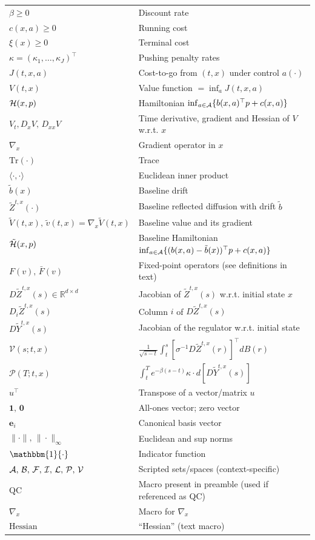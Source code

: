 \documentclass[11pt]{article}
\theoremstyle{definition}
\theoremstyle{plain}
\newcommand{\R}{\mathbb{R}}
\newcommand{\qc}{\textrm{QC}}
\newcommand{\cF}{{\cal F}}
\newcommand{\cB}{{\cal B}}
\newcommand{\cH}{{\cal H}}
\newcommand{\cV}{{\cal V}}
\newcommand{\cA}{{\cal A}}
\newcommand{\cP}{{\cal P}}
\newcommand{\cI}{{\cal I}}
\newcommand{\cL}{{\cal L}}
\newcommand{\tb}{\tilde{b}}
\newcommand{\be}{\bm{e}}
\newcommand{\bZero}{\bm{0}}
\newcommand{\bOne}{\bm{1}}
\newcommand{\mbOne}{\mathbbm{1}}
\newcommand{\tr}{\text{Tr}}
\newcommand{\Hess}{\text{Hessian}}
\newcommand{\grad}{\nabla_x}
\begin{document}
\begin{longtable}{@{}ll@{}}
$\beta\ge 0$ & Discount rate \\
$c(x,a)\ge 0$ & Running cost \\
$\xi(x)\ge 0$ & Terminal cost \\
$\kappa=(\kappa_1,\dots,\kappa_J)^{\top}$ & Pushing penalty rates \\
$J(t,x,a)$ & Cost-to-go from $(t,x)$ under control $a(\cdot)$ \\
$V(t,x)$ & Value function $=\inf_a J(t,x,a)$ \\
$\cH(x,p)$ & Hamiltonian $\inf_{a\in\cA}\{ b(x,a)^{\top}p + c(x,a)\}$ \\
$V_t, D_x V,\, D_{xx}V$ & Time derivative, gradient and Hessian of $V$ w.r.t. $x$ \\
$\nabla_x$ & Gradient operator in $x$ \\
$\tr(\cdot)$ & Trace \\
$\langle\cdot,\cdot\rangle$ & Euclidean inner product \\

$\tb(x)$ & Baseline drift \\
$\tilde Z^{t,x}(\cdot)$ & Baseline reflected diffusion with drift $\tb$ \\
$\tilde V(t,x),\, \tilde v(t,x)=\nabla_x \tilde V(t,x)$ & Baseline value and its gradient \\
$\tilde \cH(x,p)$ & Baseline Hamiltonian $\inf_{a\in\cA}\{(b(x,a)-\tb(x))^{\top}p + c(x,a)\}$ \\
$F(v),\, \bar F(v)$ & Fixed-point operators (see definitions in text) \\

$D\tilde Z^{t,x}(s)\in\R^{d\times d}$ & Jacobian of $\tilde Z^{t,x}(s)$ w.r.t. initial state $x$ \\
$D_i\tilde Z^{t,x}(s)$ & Column $i$ of $D\tilde Z^{t,x}(s)$ \\
$D\tilde Y^{t,x}(s)$ & Jacobian of the regulator w.r.t. initial state \\
$\mathcal{V}(s;t,x)$ & $\frac{1}{\sqrt{s-t}}\int_t^s [\sigma^{-1}D\tilde Z^{t,x}(r)]^{\top} dB(r)$ \\
$\mathcal{P}(T;t,x)$ & $\int_t^T e^{-\beta(s-t)} \kappa \cdot d[ D\tilde Y^{t,x}(s) ]$ \\

$u^{\top}$ & Transpose of a vector/matrix $u$ \\
$\bOne,\, \bZero$ & All-ones vector; zero vector \\
$\be_i$ & Canonical basis vector \\
$\|\cdot\|,\, \|\cdot\|_\infty$ & Euclidean and sup norms \\
$\mbOne\{\cdot\}$ & Indicator function \\

$\cA,\, \cB,\, \cF,\, \cI,\, \cL,\, \cP,\, \cV$ & Scripted sets/spaces (context-specific) \\
$\qc$ & Macro present in preamble (used if referenced as QC) \\
$\grad$ & Macro for $\nabla_x$ \\
$\Hess$ & “Hessian” (text macro) \\

\end{longtable}
\fi
\end{document}
